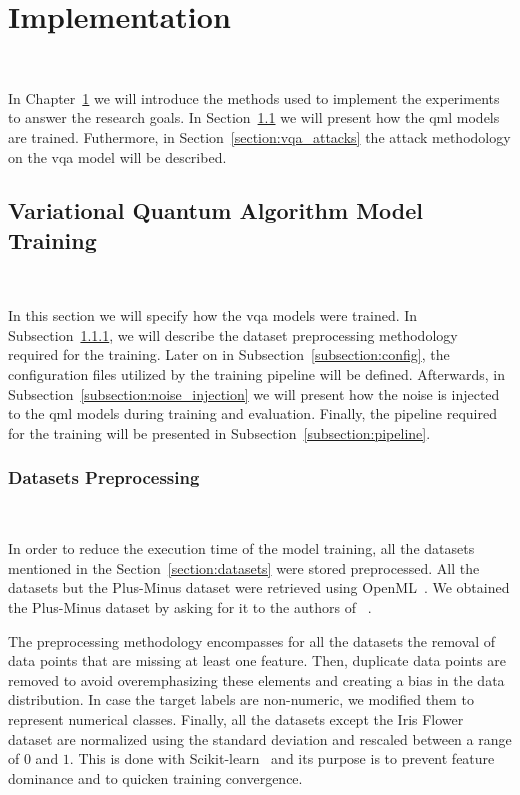 \chapter{Implementation}\label{chapter:implementation} \

In Chapter~\ref{chapter:implementation} we will introduce
the methods used to implement the experiments to answer
the research goals. In Section~\ref{section:vqa_training}
we will present how the \ac{qml} models are trained.
Futhermore, in Section~\ref{section:vqa_attacks} the
attack methodology on the \ac{vqa} model will be described. \

\section{Variational Quantum Algorithm Model Training}\label{section:vqa_training} \

In this section we will specify how the \ac{vqa} models
were trained. In Subsection~\ref{subsection:preprocess},
we will describe the dataset preprocessing methodology required
for the training. Later on in Subsection~\ref{subsection:config},
the configuration files utilized by the training pipeline will
be defined. Afterwards, in Subsection~\ref{subsection:noise_injection}
we will present how the noise is injected to the
\ac{qml} models during training and evaluation.
Finally, the pipeline required for the training will
be presented in Subsection~\ref{subsection:pipeline}. \

\subsection{Datasets Preprocessing}\label{subsection:preprocess} \

In order to reduce the execution time of the model training, all the
datasets mentioned in the Section~\ref{section:datasets} were
stored preprocessed. All the datasets but the Plus-Minus dataset
were retrieved using OpenML~\cite{vanschoren_openml_2014}. We
obtained the Plus-Minus dataset by asking for it to the authors of 
~\cite{wendlinger_comparative_2024}. \

The preprocessing methodology encompasses for all the datasets the
removal of data points that are missing at least one feature.
Then, duplicate data points are removed to avoid overemphasizing
these elements and creating a bias in the data distribution. In
case the target labels are non-numeric, we modified them to
represent numerical classes. Finally, all the datasets except
the Iris Flower dataset are normalized using the standard
deviation and rescaled between a range of \(0\) and \(1\). This
is done with Scikit-learn~\cite{pedregosa_scikit-learn_2011}
and its purpose is to prevent feature dominance and to quicken
training convergence. \

